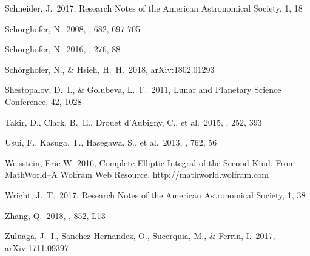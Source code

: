 \documentclass[a4paper,fleqn,usenatbib]{mnras}
\begin{document}
\begin{thebibliography}{99}
 Schneider, J.\ 2017, Research Notes of the American Astronomical Society, 1, 18

 Schorghofer, N.\ 2008, \apj, 682, 697-705 

 Schorghofer, N.\ 2016, \icarus, 276, 88

 Sch{\"o}rghofer, N., \& Hsieh, H.~H.\ 2018, arXiv:1802.01293

 Shestopalov, D.~I., \& Golubeva, L.~F.\ 2011, Lunar and Planetary Science Conference, 42, 1028

 Takir, D., Clark, B.~E., Drouet d'Aubigny, C., et al.\ 2015, \icarus, 252, 393 

 Usui, F., Kasuga, T., Hasegawa, S., et al.\ 2013, \apj, 762, 56 

 Weisstein, Eric W. 2016, Complete Elliptic Integral of the Second Kind. From MathWorld--A Wolfram Web Resource. http://mathworld.wolfram.com

 Wright, J.~T.\ 2017, Research Notes of the American Astronomical Society, 1, 38 

 Zhang, Q.\ 2018, \apjl, 852, L13

 Zuluaga, J.~I., Sanchez-Hernandez, O., Sucerquia, M., \& Ferrin, I.\ 2017, arXiv:1711.09397

\end{thebibliography}



\bsp	%
\label{lastpage}
\end{document}
